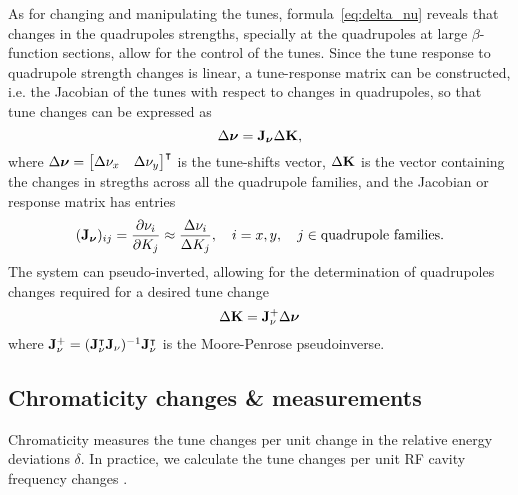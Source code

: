 As for changing and manipulating the tunes, formula~\eqref{eq:delta_nu} reveals that changes in the quadrupoles strengths, specially at the quadrupoles at large $\beta$-function sections, allow for the control of the tunes.  Since the tune response to quadrupole strength changes is linear, a tune-response matrix can be constructed, i.e. the Jacobian of the tunes with respect to changes in quadrupoles, so that tune changes can be expressed as
\begin{equation}
    \Delta\boldsymbol{\nu} = \vb{J}_{\boldsymbol{\nu}}\Delta \vb{K},
\end{equation}
where $\Delta\boldsymbol{\nu} = \mqty*[\Delta \nu_x & \Delta \nu_y]^\intercal$ is the tune-shifts vector, $\Delta \vb{K}$ is the vector containing the changes in stregths across all the quadrupole families, and the Jacobian or response matrix has entries
\begin{equation}
    (\vb{J}_{\boldsymbol{\nu}})_{ij} = \pdv{\nu_{i}}{K_j} \approx \frac{\Delta \nu_{i}}{\Delta K_j}, \quad i=x, y,\quad j\in\text{quadrupole families}.
\end{equation}
The system can pseudo-inverted, allowing for the determination of quadrupoles changes required for a desired tune change
\begin{equation}
    \Delta \vb{K} = \vb{J}_{\nu}^{+}\Delta \boldsymbol{\nu}
\end{equation}
where $\vb{J}_{\nu}^{+} = (\vb{J}_{\nu}^{\intercal}\vb{J}_{\nu})^{-1}\vb{J}_{\nu}^{\intercal}$ is the Moore-Penrose pseudoinverse.
\subsection{Chromaticity changes \& measurements}
Chromaticity measures the tune changes per unit change in the relative energy deviations $\delta$. In practice, we calculate the tune changes per unit RF cavity frequency changes
.

